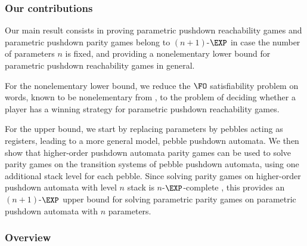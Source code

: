 \documentclass[a4paper,UKenglish,cleveref, autoref, thm-restate]{lipics-v2021}
\begin{document}

\subsubsection*{Our contributions}


Our main result consists in
proving parametric pushdown reachability games
and parametric pushdown parity games belong to $(n+1)$-$\EXP$ in case the number of parameters
$n$ is fixed,
and providing a nonelementary lower bound for parametric pushdown reachability games in general.



	For the nonelementary lower bound,
we reduce the $\FO$ satisfiability problem on words, known to be nonelementary
from \cite{Sto74}, to the
problem of deciding whether a player has a winning strategy for parametric pushdown reachability games. 

	For the upper bound, we start by replacing parameters by pebbles acting as registers, leading to a more general model, pebble pushdown automata.
 We then show that higher-order pushdown automata parity games can be used to solve parity games on
 the transition systems of pebble pushdown automata,
using one additional stack level for each pebble.
 Since solving parity games on higher-order pushdown automata with level $n$ stack is $n$-$\EXP$-complete \cite{ Cach03, cachat2007complexity}, this provides an $(n+1)$-$\EXP$ upper bound for solving parametric parity games on parametric pushdown automata with $n$ parameters.



\subsubsection*{Overview}
\end{document}
